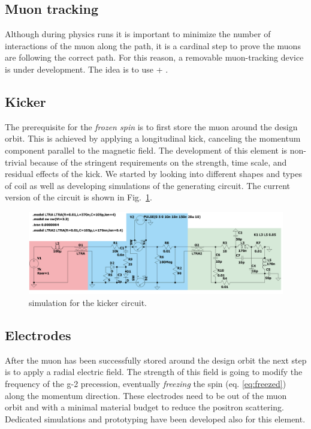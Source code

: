 \begin{refsection}
    \subsection{Muon tracking} 
        Although during physics runs it is important to minimize the number of interactions of the muon along the path, it is a cardinal step to prove the muons are following the correct path.
        For this reason, a removable muon-tracking device is under development.
        The idea is to use \tpc + \grid. \cite{muEDM:PSI:GridPix}

    \subsection{Kicker}
        The prerequisite for the \textit{frozen spin} is to first store the muon around the design orbit.
        This is achieved by applying a longitudinal kick, canceling the momentum component parallel to the magnetic field.
        The development of this element is non-trivial because of the stringent requirements on the strength, time scale, and residual effects of the kick.
        We started by looking into different shapes and types of coil as well as developing \ltsp simulations of the generating circuit.
        The current version of the circuit is shown in Fig.~\ref{fig:muEDM:kicker:circuit}.
        
        \begin{figure}
            \centering
            \includegraphics[width = \textwidth]{Figures/muEDM/CircuitMuonKickerV3_1.png}
            \caption{\ltsp simulation for the kicker circuit.}
            \label{fig:muEDM:kicker:circuit}
        \end{figure}

    \subsection{Electrodes}
        After the muon has been successfully stored around the design orbit the next step is to apply a radial electric field. 
        The strength of this field is going to modify the frequency of the g-2 precession, eventually \textit{freezing} the spin (eq. \ref{eq:freezed}) along the momentum direction.
        These electrodes need to be out of the muon orbit and with a minimal material budget to reduce the positron scattering.  
        Dedicated simulations and prototyping have been developed also for this element.


\end{refsection}
